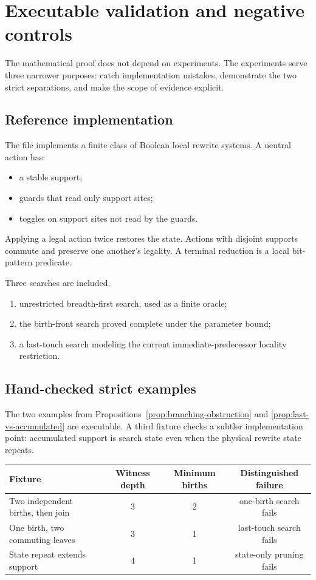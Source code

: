 \section{Executable validation and negative controls}
\label{sec:validation}

The mathematical proof does not depend on experiments.  The experiments serve
three narrower purposes: catch implementation mistakes, demonstrate the two
strict separations, and make the scope of evidence explicit.

\subsection{Reference implementation}

The file  implements a finite class of Boolean
local rewrite systems.  A neutral action has:
\begin{itemize}
\item a stable support;
\item guards that read only support sites;
\item toggles on support sites not read by the guards.
\end{itemize}
Applying a legal action twice restores the state.  Actions with disjoint
supports commute and preserve one another's legality.  A terminal reduction is
a local bit-pattern predicate.

Three searches are included.
\begin{enumerate}
\item unrestricted breadth-first search, used as a finite oracle;
\item the birth-front search proved complete under the parameter bound;
\item a last-touch search modeling the current immediate-predecessor locality
      restriction.
\end{enumerate}

\subsection{Hand-checked strict examples}

The two examples from Propositions~\ref{prop:branching-obstruction} and
\ref{prop:last-vs-accumulated} are executable.  A third fixture checks a
subtler implementation point: accumulated support is search state even when the
physical rewrite state repeats.

\begin{center}
\begin{tabular}{@{}lccc@{}}
\toprule
Fixture & Witness depth & Minimum births & Distinguished failure \\
\midrule
Two independent births, then join & 3 & 2 & one-birth search fails \\
One birth, two commuting leaves & 3 & 1 & last-touch search fails \\
State repeat extends support & 4 & 1 & state-only pruning fails \\
\bottomrule
\end{tabular}
\end{center}

